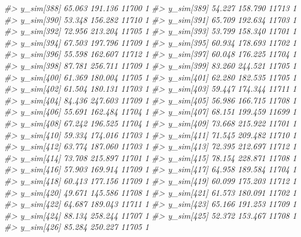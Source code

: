 \documentclass[
  10pt,
  italian,
  a4paper,
  extrafontsizes,onecolumn,openright
  ]{memoir}
\newenvironment{Shaded}{\begin{snugshade}}{\end{snugshade}}
\newcommand{\CommentTok}[1]{\textcolor[rgb]{0.56,0.35,0.01}{\textit{#1}}}
\begin{document}
\begin{Shaded}
\begin{Highlighting}[]
\CommentTok{\#\textgreater{} y\_sim[388] 65.063 191.136 11700    1}
\CommentTok{\#\textgreater{} y\_sim[389] 54.227 158.790 11713    1}
\CommentTok{\#\textgreater{} y\_sim[390] 53.348 156.282 11710    1}
\CommentTok{\#\textgreater{} y\_sim[391] 65.709 192.634 11703    1}
\CommentTok{\#\textgreater{} y\_sim[392] 72.956 213.204 11705    1}
\CommentTok{\#\textgreater{} y\_sim[393] 53.799 158.340 11701    1}
\CommentTok{\#\textgreater{} y\_sim[394] 67.503 197.796 11709    1}
\CommentTok{\#\textgreater{} y\_sim[395] 60.934 178.693 11702    1}
\CommentTok{\#\textgreater{} y\_sim[396] 55.598 162.607 11712    1}
\CommentTok{\#\textgreater{} y\_sim[397] 60.048 176.225 11704    1}
\CommentTok{\#\textgreater{} y\_sim[398] 87.781 256.711 11709    1}
\CommentTok{\#\textgreater{} y\_sim[399] 83.260 244.521 11705    1}
\CommentTok{\#\textgreater{} y\_sim[400] 61.369 180.004 11705    1}
\CommentTok{\#\textgreater{} y\_sim[401] 62.280 182.535 11705    1}
\CommentTok{\#\textgreater{} y\_sim[402] 61.504 180.131 11703    1}
\CommentTok{\#\textgreater{} y\_sim[403] 59.447 174.344 11711    1}
\CommentTok{\#\textgreater{} y\_sim[404] 84.436 247.603 11709    1}
\CommentTok{\#\textgreater{} y\_sim[405] 56.986 166.715 11708    1}
\CommentTok{\#\textgreater{} y\_sim[406] 55.691 162.484 11704    1}
\CommentTok{\#\textgreater{} y\_sim[407] 68.151 199.459 11699    1}
\CommentTok{\#\textgreater{} y\_sim[408] 67.242 196.525 11704    1}
\CommentTok{\#\textgreater{} y\_sim[409] 73.668 215.922 11701    1}
\CommentTok{\#\textgreater{} y\_sim[410] 59.334 174.016 11703    1}
\CommentTok{\#\textgreater{} y\_sim[411] 71.545 209.482 11710    1}
\CommentTok{\#\textgreater{} y\_sim[412] 63.774 187.060 11703    1}
\CommentTok{\#\textgreater{} y\_sim[413] 72.395 212.697 11712    1}
\CommentTok{\#\textgreater{} y\_sim[414] 73.708 215.897 11701    1}
\CommentTok{\#\textgreater{} y\_sim[415] 78.154 228.871 11708    1}
\CommentTok{\#\textgreater{} y\_sim[416] 57.903 169.914 11709    1}
\CommentTok{\#\textgreater{} y\_sim[417] 64.958 189.584 11704    1}
\CommentTok{\#\textgreater{} y\_sim[418] 60.413 177.156 11709    1}
\CommentTok{\#\textgreater{} y\_sim[419] 60.099 175.203 11712    1}
\CommentTok{\#\textgreater{} y\_sim[420] 49.671 145.586 11708    1}
\CommentTok{\#\textgreater{} y\_sim[421] 61.573 180.091 11702    1}
\CommentTok{\#\textgreater{} y\_sim[422] 64.687 189.043 11711    1}
\CommentTok{\#\textgreater{} y\_sim[423] 65.166 191.253 11709    1}
\CommentTok{\#\textgreater{} y\_sim[424] 88.134 258.244 11707    1}
\CommentTok{\#\textgreater{} y\_sim[425] 52.372 153.467 11708    1}
\CommentTok{\#\textgreater{} y\_sim[426] 85.284 250.227 11705    1}

\end{Highlighting}
\end{Shaded}
\end{document}
